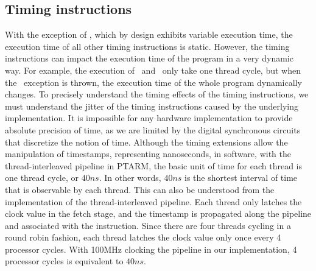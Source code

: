 \subsection{Timing instructions}
\label{sec:jitter_of_timing_instructions}
With the exception of \delayuntil, which by design exhibits variable execution time, the execution time of all other timing instructions is static.  
However, the timing instructions can impact the execution time of the program in a very dynamic way.
For example, the execution of \exceptiononexpire\ and \deactivateexception\ only take one thread cycle, but when the \timerexpired\ exception is thrown, the execution time of the whole program dynamically changes. 
To precisely understand the timing effects of the timing instructions, we must understand the jitter of the timing instructions caused by the underlying implementation.
It is impossible for any hardware implementation to provide absolute precision of time, as we are limited by the digital synchronous circuits that discretize the notion of time. 
Although the timing extensions allow the manipulation of timestamps, representing nanoseconds, in software, with the thread-interleaved pipeline in PTARM, the basic unit of time for each thread is one thread cycle, or $40ns$.
In other words, $40ns$ is the shortest interval of time that is observable by each thread.
This can also be understood from the implementation of the thread-interleaved pipeline.
Each thread only latches the clock value in the fetch stage, and the timestamp is propagated along the pipeline and associated with the instruction. 
Since there are four threads cycling in a round robin fashion, each thread latches the clock value only once every 4 processor cycles. 
With 100MHz clocking the pipeline in our implementation, 4 processor cycles is equivalent to $40ns$.

